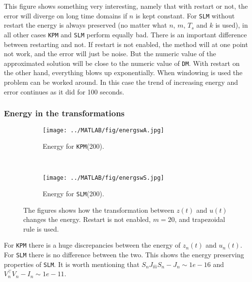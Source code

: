 This figure shows something very interesting, namely that with restart or not, the error will diverge on long time domains if $n$ is kept constant. For \texttt{SLM} without restart the energy is always preserved (no matter what $n$, $m$, $T_s$ and $k$ is used), in all other cases \texttt{KPM} and \texttt{SLM} perform equally bad. There is an important difference between restarting and not. If restart is not enabled, the method will at one point not work, and the error will just be noise. But the numeric value of the approximated solution will be close to the numeric value of \texttt{DM}. With restart on the other hand, everything blows up exponentially. When windowing is used the problem can be worked around. In this case the trend of increasing energy and error continues as it did for 100 seconds. \\

\subsubsection{Energy in the transformations}%

\begin{figure}[H]
        \centering
        \begin{subfigure}[b]{0.45\textwidth}
                \texttt{[image: ../MATLAB/fig/energswA.jpg]}
                \caption{ Energy for \texttt{KPM}(200). }
                \label{fig:energyswA}
        \end{subfigure}
        ~
		\begin{subfigure}[b]{0.45\textwidth}
                \texttt{[image: ../MATLAB/fig/energswS.jpg]}
                \caption{ Energy for \texttt{SLM}(200). }
                \label{fig:energswS}
        \end{subfigure}        
        \caption{ The figures shows how the transformation between $z(t)$ and $u(t)$ changes the energy. Restart is not enabled, $m = 20$, and trapezoidal rule is used. }
        \label{fig:energs}
\end{figure}
For \texttt{KPM} there is a huge discrepancies between the energy of $z_{n}(t)$ and $u_{n}(t)$. For \texttt{SLM} there is no difference between the two. This shows the energy preserving properties of \texttt{SLM}. It is worth mentioning that $S_n J_{\hat{m}}S_n - J_n \sim 1e-16$ and $V_n^\top V_n - I_n \sim 1e-11$.
